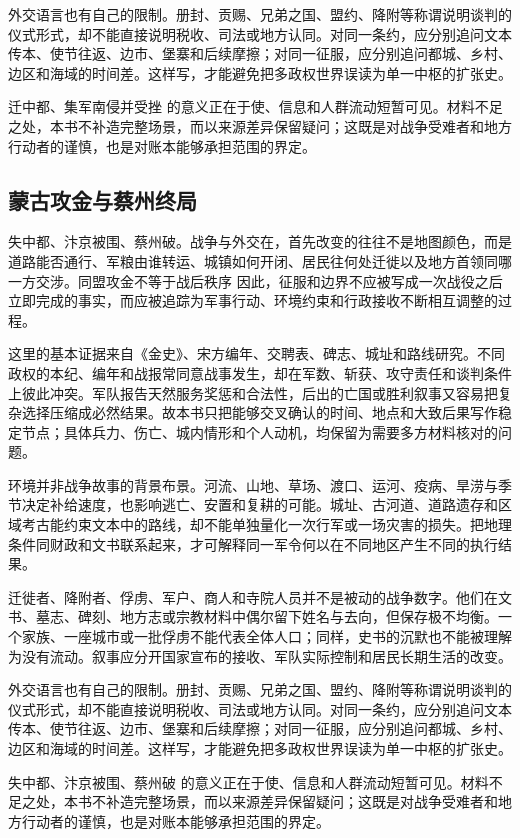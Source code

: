外交语言也有自己的限制。册封、贡赐、兄弟之国、盟约、降附等称谓说明谈判的仪式形式，却不能直接说明税收、司法或地方认同。对同一条约，应分别追问文本传本、使节往返、边市、堡寨和后续摩擦；对同一征服，应分别追问都城、乡村、边区和海域的时间差。这样写，才能避免把多政权世界误读为单一中枢的扩张史。

迁中都、集军南侵并受挫 的意义正在于使、信息和人群流动短暂可见。材料不足之处，本书不补造完整场景，而以来源差异保留疑问；这既是对战争受难者和地方行动者的谨慎，也是对账本能够承担范围的界定。

\subsection{蒙古攻金与蔡州终局}

失中都、汴京被围、蔡州破。战争与外交在，首先改变的往往不是地图颜色，而是道路能否通行、军粮由谁转运、城镇如何开闭、居民往何处迁徙以及地方首领同哪一方交涉。同盟攻金不等于战后秩序 因此，征服和边界不应被写成一次战役之后立即完成的事实，而应被追踪为军事行动、环境约束和行政接收不断相互调整的过程。

这里的基本证据来自《金史》、宋方编年、交聘表、碑志、城址和路线研究。不同政权的本纪、编年和战报常同意战事发生，却在军数、斩获、攻守责任和谈判条件上彼此冲突。军队报告天然服务奖惩和合法性，后出的亡国或胜利叙事又容易把复杂选择压缩成必然结果。故本书只把能够交叉确认的时间、地点和大致后果写作稳定节点；具体兵力、伤亡、城内情形和个人动机，均保留为需要多方材料核对的问题。

环境并非战争故事的背景布景。河流、山地、草场、渡口、运河、疫病、旱涝与季节决定补给速度，也影响逃亡、安置和复耕的可能。城址、古河道、道路遗存和区域考古能约束文本中的路线，却不能单独量化一次行军或一场灾害的损失。把地理条件同财政和文书联系起来，才可解释同一军令何以在不同地区产生不同的执行结果。

迁徙者、降附者、俘虏、军户、商人和寺院人员并不是被动的战争数字。他们在文书、墓志、碑刻、地方志或宗教材料中偶尔留下姓名与去向，但保存极不均衡。一个家族、一座城市或一批俘虏不能代表全体人口；同样，史书的沉默也不能被理解为没有流动。叙事应分开国家宣布的接收、军队实际控制和居民长期生活的改变。

外交语言也有自己的限制。册封、贡赐、兄弟之国、盟约、降附等称谓说明谈判的仪式形式，却不能直接说明税收、司法或地方认同。对同一条约，应分别追问文本传本、使节往返、边市、堡寨和后续摩擦；对同一征服，应分别追问都城、乡村、边区和海域的时间差。这样写，才能避免把多政权世界误读为单一中枢的扩张史。

失中都、汴京被围、蔡州破 的意义正在于使、信息和人群流动短暂可见。材料不足之处，本书不补造完整场景，而以来源差异保留疑问；这既是对战争受难者和地方行动者的谨慎，也是对账本能够承担范围的界定。

